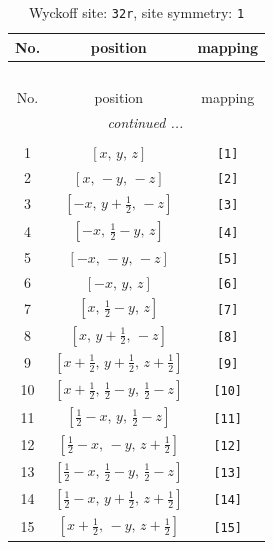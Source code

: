 \documentclass[fleqn,8pt]{jsarticle}
\begin{document}
\renewcommand{\arraystretch}{1.2}
\begin{longtable}{ccc}
\caption{Wyckoff site: {\tt 32r}, site symmetry: {\tt 1}}
 \\
 \hline \hline
No. & position & mapping \\ \hline \endfirsthead

\multicolumn{2}{l}{\tablename\ \thetable{}} \\
 \hline \hline
No. & position & mapping \\ \hline \endhead

 \hline \hline
\multicolumn{2}{r}{\footnotesize\it continued ...} \\ \endfoot

 \hline \hline
\multicolumn{2}{r}{} \\ \endlastfoot

1 & $\left[ x,\, y,\, z \right]$ & {\tt [1]} \\ \hline
2 & $\left[ x,\, - y,\, - z \right]$ & {\tt [2]} \\ \hline
3 & $\left[ - x,\, y + \frac{1}{2},\, - z \right]$ & {\tt [3]} \\ \hline
4 & $\left[ - x,\, \frac{1}{2} - y,\, z \right]$ & {\tt [4]} \\ \hline
5 & $\left[ - x,\, - y,\, - z \right]$ & {\tt [5]} \\ \hline
6 & $\left[ - x,\, y,\, z \right]$ & {\tt [6]} \\ \hline
7 & $\left[ x,\, \frac{1}{2} - y,\, z \right]$ & {\tt [7]} \\ \hline
8 & $\left[ x,\, y + \frac{1}{2},\, - z \right]$ & {\tt [8]} \\ \hline
9 & $\left[ x + \frac{1}{2},\, y + \frac{1}{2},\, z + \frac{1}{2} \right]$ & {\tt [9]} \\ \hline
10 & $\left[ x + \frac{1}{2},\, \frac{1}{2} - y,\, \frac{1}{2} - z \right]$ & {\tt [10]} \\ \hline
11 & $\left[ \frac{1}{2} - x,\, y,\, \frac{1}{2} - z \right]$ & {\tt [11]} \\ \hline
12 & $\left[ \frac{1}{2} - x,\, - y,\, z + \frac{1}{2} \right]$ & {\tt [12]} \\ \hline
13 & $\left[ \frac{1}{2} - x,\, \frac{1}{2} - y,\, \frac{1}{2} - z \right]$ & {\tt [13]} \\ \hline
14 & $\left[ \frac{1}{2} - x,\, y + \frac{1}{2},\, z + \frac{1}{2} \right]$ & {\tt [14]} \\ \hline
15 & $\left[ x + \frac{1}{2},\, - y,\, z + \frac{1}{2} \right]$ & {\tt [15]} \\ \hline

\end{longtable}
\end{document}
